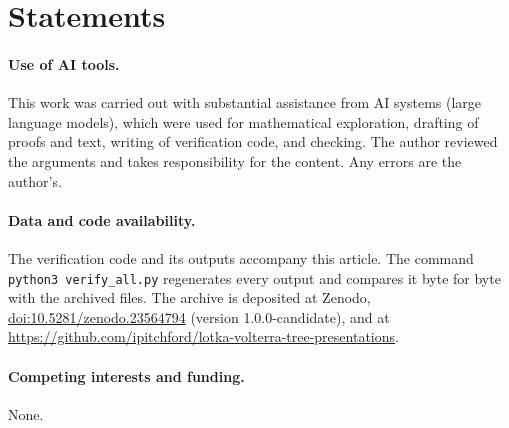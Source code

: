 \documentclass[11pt,a4paper]{article}
\theoremstyle{definition}
\theoremstyle{remark}
\begin{document}
\section*{Statements}
\label{lv:sec:data}

\paragraph{Use of AI tools.}
This work was carried out with substantial assistance from AI systems (large language models), which were used for mathematical exploration, drafting of proofs and text, writing of verification code, and checking. The author reviewed the arguments and takes responsibility for the content. Any errors are the author's.

\paragraph{Data and code availability.}
The verification code and its outputs accompany this article. The command \texttt{python3 verify\_all.py} regenerates every output and compares it byte for byte with the archived files. The archive is deposited at Zenodo, \href{https://doi.org/10.5281/zenodo.23564794}{doi:10.5281/zenodo.23564794} (version 1.0.0-candidate), and at \url{https://github.com/ipitchford/lotka-volterra-tree-presentations}.

\paragraph{Competing interests and funding.}
None.
\end{document}
